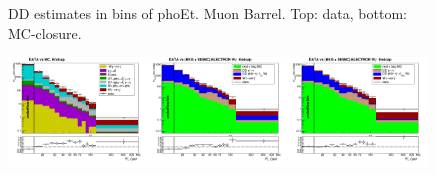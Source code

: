 \begin{figure}[htb]
\begin{center}
  \caption{DD estimates in bins of phoEt. Muon Barrel. Top: data, bottom: MC-closure. }
  \end{center}
\end{figure}

\begin{figure}[htb]
  \begin{center}
   \includegraphics[width=0.33\textwidth]{../figs/figs_v11/ELECTRON_WGamma/PrepareYields/c_TotalDATAvsMC_Endcap__phoEt.png}\includegraphics[width=0.33\textwidth]{../figs/figs_v11/ELECTRON_WGamma/PrepareYields/c_DATAvsBkgPlusSigMCc_ELECTRON_WGamma_TEMPL_CHISO_UNblind__Endcap__phoEt.png}\includegraphics[width=0.33\textwidth]{../figs/figs_v11/ELECTRON_WGamma/PrepareYields/c_DATAvsBkgPlusSigMCc_ELECTRON_WGamma_TEMPL_SIHIH_UNblind__Endcap__phoEt.png}

\end{center}
\end{figure}
